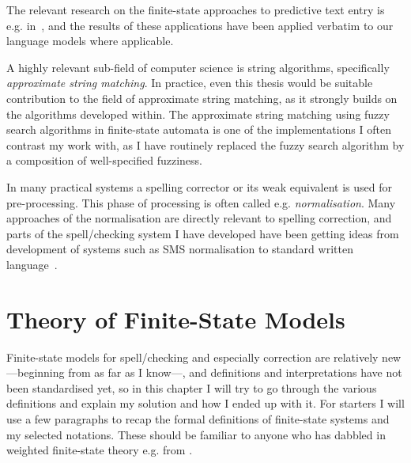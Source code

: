 \documentclass[officiallayout]{unihelcompling}
\begin{document}
The relevant research on the finite-state approaches to predictive text entry
is e.g. in~\citep{silfverberg2010partofspeech}, and the results of
these applications have been applied verbatim to our language models where
applicable.

A highly relevant sub-field of computer science is string algorithms,
specifically \emph{approximate string matching}. In practice, even this
thesis would be suitable contribution to the field of approximate string
matching, as it strongly builds on the algorithms developed within. The
approximate string matching using fuzzy search algorithms in finite-state
automata is one of the implementations I often contrast my work with, as
I have routinely replaced the fuzzy search algorithm by a composition of
well-specified fuzziness.

In many practical systems a spelling corrector or its weak equivalent is used
for pre-processing. This phase of processing is often called e.g. 
\emph{normalisation}. Many approaches of the normalisation are directly
relevant to spelling correction, and parts of the spell\-/checking system I have
developed have been getting ideas from development of systems such as SMS
normalisation to standard written language~\citep{kobus2008normalizing}.

\section{Theory of Finite-State Models}
\label{sec:finite-state-theory}

Finite-state models for spell\-/checking and especially correction are relatively
new---beginning from \citep{oflazer1996errortolerant} as far as I know---, and
definitions and interpretations have not been standardised yet, so in this
chapter I will try to go through the various definitions and explain my
solution and how I ended up with it. For starters I will use a few paragraphs
to recap the formal definitions of finite-state systems and my selected
notations. These should be familiar to anyone who has dabbled in weighted
finite-state theory e.g. from \citet{aho2007compilers,mohri1997finitestate}.
\end{document}
